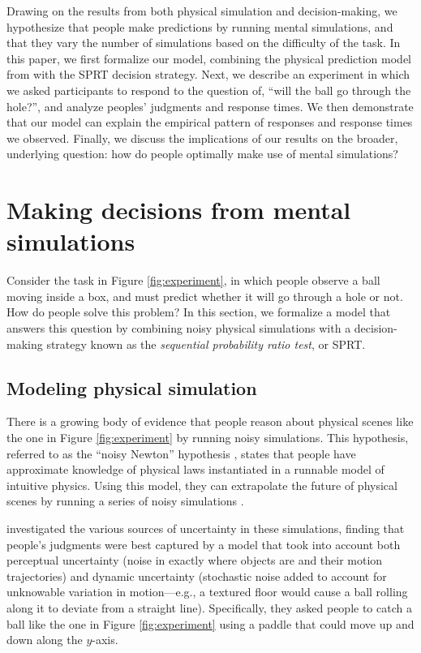 \documentclass[10pt,letterpaper]{article}
\begin{document}
Drawing on the results from both physical simulation and decision-making, we hypothesize that people make predictions by running mental simulations, and that they vary the number of simulations based on the difficulty of the task.
In this paper, we first formalize our model, combining the physical prediction model from  with the SPRT decision strategy. 
Next, we describe an experiment in which we asked participants to respond to the question of, ``will the ball go through the hole?'', and analyze peoples' judgments and response times. 
We then demonstrate that our model can explain the empirical pattern of responses and response times we observed. 
Finally, we discuss the implications of our results on the broader, underlying question: how do people optimally make use of mental simulations?

\section{Making decisions from mental simulations}

Consider the task in Figure \ref{fig:experiment}, in which people observe a ball moving inside a box, and must predict whether it will go through a hole or not.
How do people solve this problem?
In this section, we formalize a model that answers this question by combining noisy physical simulations with a decision-making strategy known as the \emph{sequential probability ratio test}, or SPRT.

\subsection{Modeling physical simulation}

There is a growing body of evidence that people reason about physical scenes like the one in Figure \ref{fig:experiment} by running noisy simulations.
This hypothesis, referred to as the ``noisy Newton'' hypothesis \cite{Sanborn2013}, states that people have approximate knowledge of physical laws instantiated in a runnable model of intuitive physics.
Using this model, they can extrapolate the future of physical scenes by running a series of noisy simulations \cite{Smith:2013fc,Battaglia2013,Smith:2013ug,Smith:2013th,Smith:2014tx,Ullman:2014ut,Hamrick:2015}.

 investigated the various sources of uncertainty in these simulations, finding that people's judgments were best captured by a model that took into account both perceptual uncertainty (noise in exactly where objects are and their motion trajectories) and dynamic uncertainty (stochastic noise added to account for unknowable variation in motion---e.g., a textured floor would cause a ball rolling along it to deviate from a straight line).
Specifically, they asked people to catch a ball like the one in Figure \ref{fig:experiment} using a paddle that could move up and down along the $y$-axis.
\end{document}

